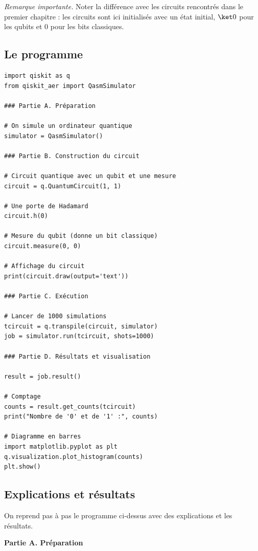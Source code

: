 \documentclass[11pt,class=report,crop=false]{standalone}
\begin{document}
\bigskip

\emph{Remarque importante.} Noter la différence avec les circuits rencontrés dans le premier chapitre :  les circuits sont ici initialisés avec un état initial,  $\ket0$ pour les qubits et $0$ pour les bits classiques.


\subsection{Le programme}

\begin{lstlisting}
import qiskit as q
from qiskit_aer import QasmSimulator

### Partie A. Préparation

# On simule un ordinateur quantique
simulator = QasmSimulator()

### Partie B. Construction du circuit

# Circuit quantique avec un qubit et une mesure
circuit = q.QuantumCircuit(1, 1)

# Une porte de Hadamard
circuit.h(0)

# Mesure du qubit (donne un bit classique)
circuit.measure(0, 0)

# Affichage du circuit
print(circuit.draw(output='text'))  

### Partie C. Exécution 

# Lancer de 1000 simulations
tcircuit = q.transpile(circuit, simulator)
job = simulator.run(tcircuit, shots=1000)

### Partie D. Résultats et visualisation

result = job.result()

# Comptage
counts = result.get_counts(tcircuit)
print("Nombre de '0' et de '1' :", counts)

# Diagramme en barres
import matplotlib.pyplot as plt
q.visualization.plot_histogram(counts)
plt.show()
\end{lstlisting}

\subsection{Explications et résultats}

On reprend pas à pas le programme ci-dessus avec des explications et les résultats.

\textbf{Partie A. Préparation}
\end{document}
